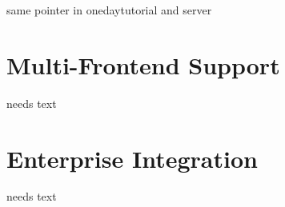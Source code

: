 \documentclass[a4paper,10pt,twoside]{book}
\begin{document}
same pointer in onedaytutorial and server

\section{Multi-Frontend Support}
needs text

\section{Enterprise Integration}
needs text

\ifx\wholebook\relax\else
   
   
\end{document}
